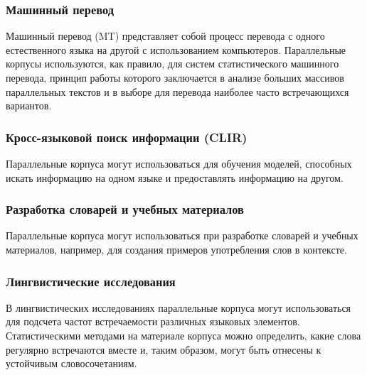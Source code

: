 \subsubsection*{Машинный перевод}

Машинный перевод (MT) представляет собой процесс перевода с одного естественного языка на другой с использованием компьютеров.
Параллельные корпусы используются, как правило, для систем статистического машинного перевода, принцип работы которого заключается в анализе больших массивов параллельных текстов и в выборе для перевода наиболее часто встречающихся вариантов.



\subsubsection*{Кросс-языковой поиск информации (CLIR)}

Параллельные корпуса могут использоваться для обучения моделей, способных искать информацию на одном языке и предоставлять информацию на другом.

\subsubsection*{Разработка словарей и учебных материалов}


Параллельные корпуса могут использоваться при разработке словарей и учебных материалов, например, для создания примеров употребления слов в контексте.

\subsubsection*{Лингвистические исследования}

В лингвистических исследованиях параллельные корпуса могут использоваться для подсчета частот встречаемости различных языковых элементов.
Статистическими методами на материале корпуса можно определить, какие слова регулярно встречаются вместе и, таким образом, могут быть отнесены к устойчивым словосочетаниям. \cite[с. 81]{cl}


